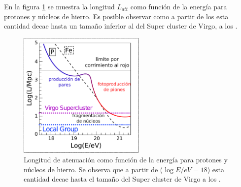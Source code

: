 En la figura \ref{fig:protProp} se muestra la longitud $L_{att}$ como funci\'on de la energ\'ia para protones y n\'ucleos de hierro. 
Es posible observar como a partir de los  esta cantidad decae hasta un tama\~no inferior al del Super cluster de Virgo, a los .
%
\begin{figure}[ht]
	\begin{center}
	\includegraphics[width=0.55\textwidth]{fig/introduccion/proton_propaga_espanol}
	\caption{\label{fig:protProp} Longitud de atenuaci\'on como funci\'on de la energ\'ia para protones y n\'ucleos de hierro. Se observa que a partir de  ($\log{E/eV}=18$) esta cantidad decae hasta el tama\~no del Super cluster de Virgo a los .}
	\end{center}
\end{figure}
%

